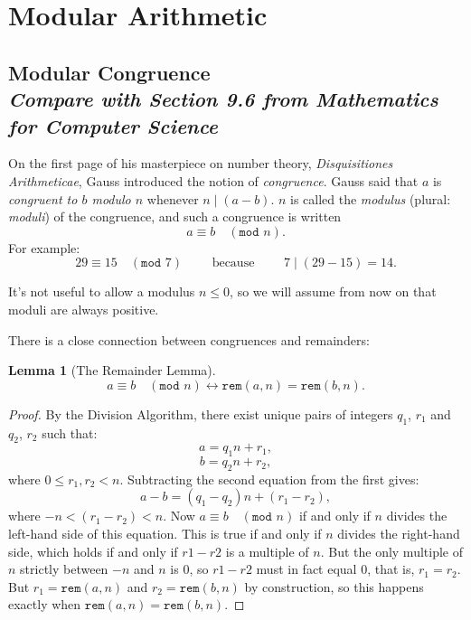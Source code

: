 \documentclass[11pt,oneside]{book}
\newtheorem{lem}[thm]{Lemma}
\theoremstyle{definition}
\begin{document}
\section{Modular Arithmetic}
\subsection[Modular Congruence]{Modular Congruence\\[0.5ex]
\normalsize\normalfont\textit{
    Compare with Section 9.6 from \emph{Mathematics for Computer Science}
}}
On the first page of his masterpiece on number theory, \emph{Disquisitiones Arithmeticae},
Gauss introduced the notion of \emph{congruence}.
Gauss said that $a$ is \emph{congruent to $b$ modulo $n$} whenever $n \mid (a - b)$.
$n$ is called the \emph{modulus} (plural: \emph{moduli}) of the congruence, and such a congruence is written
\[ a \equiv b\quad (\texttt{mod } n). \]
For example:
\[ 29 \equiv 15\quad (\texttt{mod } 7) \qquad\text{ because }\qquad 7 \mid (29 - 15) = 14. \]

It's not useful to allow a modulus $n \leq 0$, so we will assume from now on that
moduli are always positive.

There is a close connection between congruences and remainders:

\begin{lem}[The Remainder Lemma] \label{lem:Remainder}
    \[ a \equiv b\quad (\texttt{mod } n) \leftrightarrow \texttt{rem}(a, n) = \texttt{rem}(b, n). \]
\end{lem}
\begin{proof}
    By the Division Algorithm, there exist unique pairs of integers $q_{1}$, $r_{1}$ and $q_{2}$, $r_{2}$ such that:
    \[ a = q_{1}n + r_{1}, \]
    \[ b = q_{2}n + r_{2}, \]
    where $0 \leq r_{1}, r_{2} < n$.
    Subtracting the second equation from the first gives:
    \[ a - b = (q_{1} - q_{2})n + (r_{1} - r_{2}), \]
    where $-n < (r_{1} - r_{2}) < n$.
    Now $a \equiv b\quad (\texttt{mod } n)$ if and only if $n$ divides the left-hand side of this equation.
    This is true if and only if $n$ divides
    the right-hand side, which holds if and only if $r1 - r2$ is a multiple of $n$.
    But the only multiple of $n$ strictly between $-n$ and $n$ is 0, so $r1 - r2$ must in fact equal 0, that is, $r_{1} = r_{2}$.
    But $r_{1} = \texttt{rem}(a, n)$ and $r_{2} = \texttt{rem}(b, n)$ by construction, so this happens exactly when $\texttt{rem}(a, n) = \texttt{rem}(b, n)$.
\end{proof}
\end{document}
